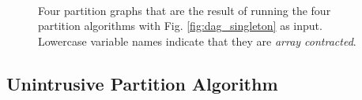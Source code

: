 \ifdefined\ShortVersion
\begin{figure}
    \vspace{-0.5cm}
    \centering
    \\
    \vspace{-0.3cm}
    \caption{Four partition graphs that are the result of running the
      four partition algorithms with Fig. \ref{fig:dag_singleton} as
      input. Lowercase variable names indicate that they are
      \emph{array contracted}.}
\end{figure}
\fi

\subsection{Unintrusive Partition Algorithm}

